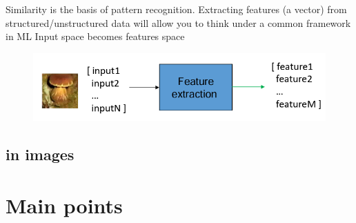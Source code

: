 \noindent Similarity is the basis of pattern recognition. Extracting features (a vector) from structured/unstructured data will allow you to think under a common framework in ML
Input space becomes features space 
\begin{figure}[H]
    \centering
    \includegraphics[width=0.8\linewidth]{09-10/images/feature space.png}
\end{figure}



\subsection{in images}

\section{Main points}